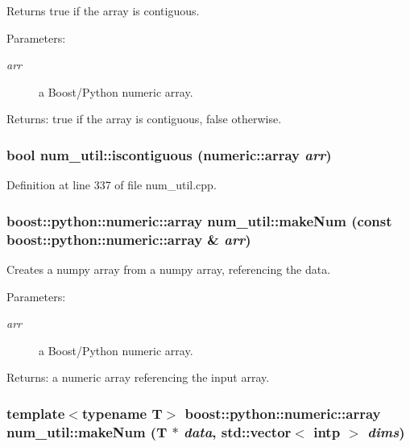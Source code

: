 Returns true if the array is contiguous. \begin{Desc}
\item[Parameters:]
\begin{description}
\item[{\em arr}]a Boost/Python numeric array. \end{description}
\end{Desc}
\begin{Desc}
\item[Returns:]true if the array is contiguous, false otherwise.\end{Desc}
\subsubsection{\setlength{\rightskip}{0pt plus 5cm}bool num\_\-util::iscontiguous (numeric::array {\em arr})}\label{namespacenum__util_a46}




Definition at line 337 of file num\_\-util.cpp.
\subsubsection{\setlength{\rightskip}{0pt plus 5cm}boost::python::numeric::array num\_\-util::make\-Num (const boost::python::numeric::array \& {\em arr})}\label{namespacenum__util_a64}


Creates a numpy array from a numpy array, referencing the data. \begin{Desc}
\item[Parameters:]
\begin{description}
\item[{\em arr}]a Boost/Python numeric array. \end{description}
\end{Desc}
\begin{Desc}
\item[Returns:]a numeric array referencing the input array.\end{Desc}
\subsubsection{\setlength{\rightskip}{0pt plus 5cm}template$<$typename T$>$ boost::python::numeric::array num\_\-util::make\-Num (T $\ast$ {\em data}, std::vector$<$ intp $>$ {\em dims})}\label{namespacenum__util_a63}


